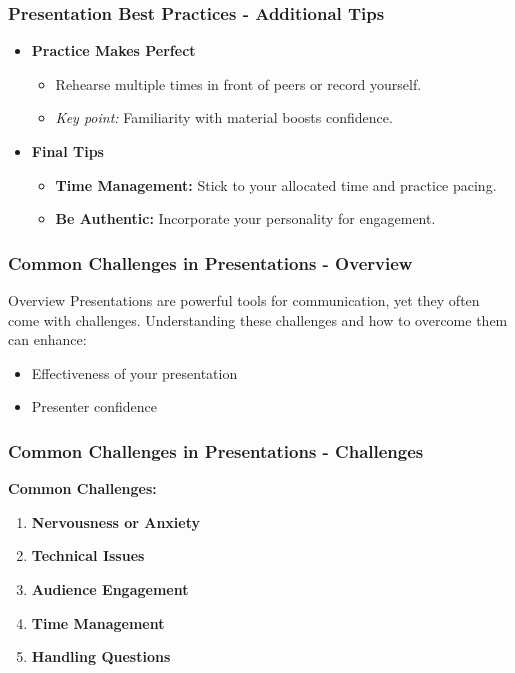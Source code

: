 \documentclass{beamer}
\begin{document}
\begin{frame}[fragile]
    \frametitle{Presentation Best Practices - Additional Tips}
    \begin{itemize}
        \item \textbf{Practice Makes Perfect}
        \begin{itemize}
            \item Rehearse multiple times in front of peers or record yourself.
            \item \textit{Key point:} Familiarity with material boosts confidence.
        \end{itemize}
        
        \item \textbf{Final Tips}
        \begin{itemize}
            \item \textbf{Time Management:} Stick to your allocated time and practice pacing.
            \item \textbf{Be Authentic:} Incorporate your personality for engagement.
        \end{itemize}
    \end{itemize}
\end{frame}

\begin{frame}[fragile]
    \frametitle{Common Challenges in Presentations - Overview}
    \begin{block}{Overview}
        Presentations are powerful tools for communication, yet they often come with challenges. 
        Understanding these challenges and how to overcome them can enhance:
        \begin{itemize}
            \item Effectiveness of your presentation
            \item Presenter confidence
        \end{itemize}
    \end{block}
\end{frame}

\begin{frame}[fragile]
    \frametitle{Common Challenges in Presentations - Challenges}
    \textbf{Common Challenges:}
    \begin{enumerate}
        \item \textbf{Nervousness or Anxiety}
        \item \textbf{Technical Issues}
        \item \textbf{Audience Engagement}
        \item \textbf{Time Management}
        \item \textbf{Handling Questions}
    \end{enumerate}
\end{frame}
\end{document}
